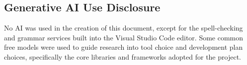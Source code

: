 \documentclass{article}
\begin{document}
\subsection*{Generative AI Use Disclosure}

No AI was used in the creation of this document, except for the spell-checking and 
grammar services built into the Visual Studio Code editor. Some common free models were 
used to guide research into tool choice and development plan choices, specifically the 
core libraries and frameworks adopted for the project.
\end{document}
